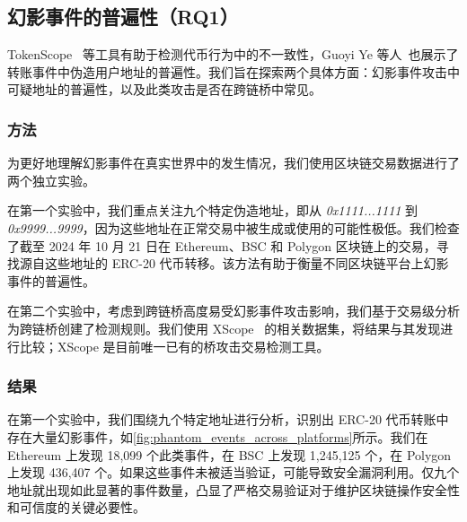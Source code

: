 \subsection{幻影事件的普遍性（RQ1）}

TokenScope~\cite{TokenScope} 等工具有助于检测代币行为中的不一致性，Guoyi Ye 等人~\cite{wallet_visual}也展示了转账事件中伪造用户地址的普遍性。我们旨在探索两个具体方面：幻影事件攻击中可疑地址的普遍性，以及此类攻击是否在跨链桥中常见。

\subsubsection{方法}

为更好地理解幻影事件在真实世界中的发生情况，我们使用区块链交易数据进行了两个独立实验。

在第一个实验中，我们重点关注九个特定伪造地址，即从 \emph{0x1111...1111} 到 \emph{0x9999...9999}，因为这些地址在正常交易中被生成或使用的可能性极低。我们检查了截至 2024 年 10 月 21 日在 Ethereum、BSC 和 Polygon 区块链上的交易，寻找源自这些地址的 ERC-20 代币转移。该方法有助于衡量不同区块链平台上幻影事件的普遍性。

在第二个实验中，考虑到跨链桥高度易受幻影事件攻击影响，我们基于交易级分析为跨链桥创建了检测规则。我们使用 XScope~\cite{Xscope} 的相关数据集，将结果与其发现进行比较；XScope 是目前唯一已有的桥攻击交易检测工具。


\subsubsection{结果}




在第一个实验中，我们围绕九个特定地址进行分析，识别出 ERC-20 代币转账中存在大量幻影事件，如\cref{fig:phantom_events_across_platforms}所示。我们在 Ethereum 上发现 18,099 个此类事件，在 BSC 上发现 1,245,125 个，在 Polygon 上发现 436,407 个。如果这些事件未被适当验证，可能导致安全漏洞利用。仅九个地址就出现如此显著的事件数量，凸显了严格交易验证对于维护区块链操作安全性和可信度的关键必要性。



